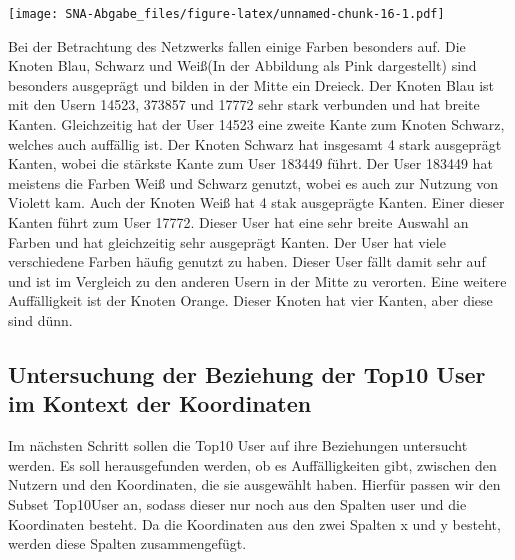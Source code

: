 \documentclass[
]{article}
\begin{document}
\texttt{[image: SNA-Abgabe\_files/figure-latex/unnamed-chunk-16-1.pdf]}

Bei der Betrachtung des Netzwerks fallen einige Farben besonders auf.
Die Knoten Blau, Schwarz und Weiß(In der Abbildung als Pink dargestellt)
sind besonders ausgeprägt und bilden in der Mitte ein Dreieck. Der
Knoten Blau ist mit den Usern 14523, 373857 und 17772 sehr stark
verbunden und hat breite Kanten. Gleichzeitig hat der User 14523 eine
zweite Kante zum Knoten Schwarz, welches auch auffällig ist. Der Knoten
Schwarz hat insgesamt 4 stark ausgeprägt Kanten, wobei die stärkste
Kante zum User 183449 führt. Der User 183449 hat meistens die Farben
Weiß und Schwarz genutzt, wobei es auch zur Nutzung von Violett kam.
Auch der Knoten Weiß hat 4 stak ausgeprägte Kanten. Einer dieser Kanten
führt zum User 17772. Dieser User hat eine sehr breite Auswahl an Farben
und hat gleichzeitig sehr ausgeprägt Kanten. Der User hat viele
verschiedene Farben häufig genutzt zu haben. Dieser User fällt damit
sehr auf und ist im Vergleich zu den anderen Usern in der Mitte zu
verorten. Eine weitere Auffälligkeit ist der Knoten Orange. Dieser
Knoten hat vier Kanten, aber diese sind dünn.

\subsection{Untersuchung der Beziehung der Top10 User im Kontext der
Koordinaten}\label{untersuchung-der-beziehung-der-top10-user-im-kontext-der-koordinaten}

Im nächsten Schritt sollen die Top10 User auf ihre Beziehungen
untersucht werden. Es soll herausgefunden werden, ob es Auffälligkeiten
gibt, zwischen den Nutzern und den Koordinaten, die sie ausgewählt
haben. Hierfür passen wir den Subset Top10User an, sodass dieser nur
noch aus den Spalten user und die Koordinaten besteht. Da die
Koordinaten aus den zwei Spalten x und y besteht, werden diese Spalten
zusammengefügt.
\end{document}
